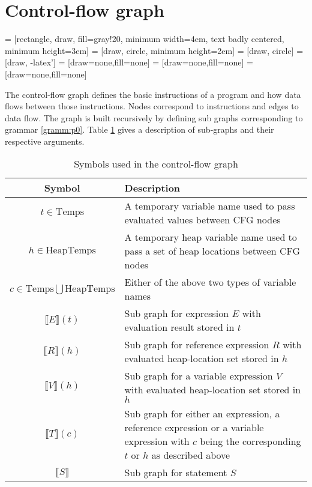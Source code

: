 \section{Control-flow graph}
\label{sec:cfg}
 = [rectangle, draw, fill=gray!20,  minimum width=4em, text badly centered, minimum height=3em]
 = [draw, circle, minimum height=2em]
 = [draw, circle]
 = [draw, -latex']
 = [draw=none,fill=none]
 = [draw=none,fill=none]
 = [draw=none,fill=none]
\newcommand{\subt}[1]{\llbracket #1\rrbracket}

The control-flow graph defines the basic instructions of a program and how data flows between those instructions. Nodes correspond to instructions and edges to data flow. The graph is built recursively by defining sub graphs corresponding to grammar \ref{gramm:p0}. Table \ref{tab:nodes} gives a description of sub-graphs and their respective arguments.

\bgroup
\def\arraystretch{1.5}
\begin{table}
\centering
\begin{tabularx}{\textwidth}{c|X}
 Symbol & Description \\\hline\hline
 $t \in \text{Temps}$ & A temporary variable name used to pass evaluated values between CFG nodes \\
 $h \in \text{HeapTemps}$ & A temporary heap variable name used to pass a set of heap locations between CFG nodes \\
 $c \in \text{Temps}\bigcup\text{HeapTemps}$ & Either of the above two types of variable names \\
 $\subt{E}(t)$ & Sub graph for expression $E$ with evaluation result stored in $t$ \\
 $\subt{R}(h)$ & Sub graph for reference expression $R$ with evaluated heap-location set stored in $h$ \\
 $\subt{V}(h)$ & Sub graph for a variable expression $V$ with evaluated heap-location set stored in $h$ \\
 $\subt{T}(c)$ & Sub graph for either an expression, a reference expression or a variable expression with $c$ being the corresponding $t$ or $h$ as described above \\
 $\subt{S}$ & Sub graph for statement $S$ 
\end{tabularx}
\caption{Symbols used in the control-flow graph}
\label{tab:nodes}
\end{table}
\egroup

